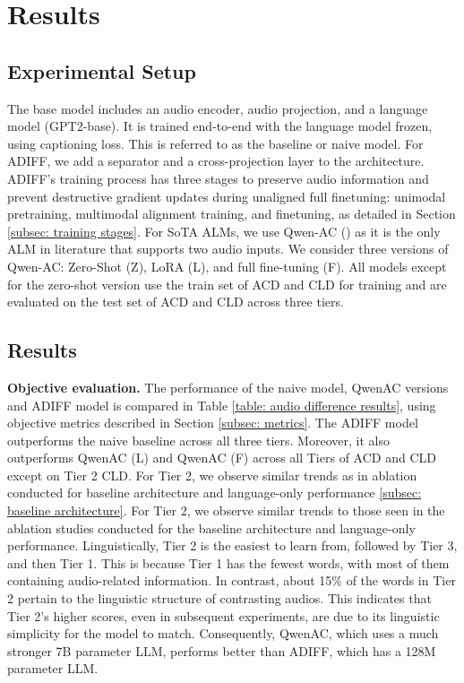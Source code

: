 \vspace{-0.1in}
\section{Results} \label{sec:results}

\vspace{-0.1in}
\subsection{Experimental Setup} 
\vspace{-0.1in}
The base model includes an audio encoder, audio projection, and a language model (GPT2-base). It is trained end-to-end with the language model frozen, using captioning loss. This is referred to as the baseline or naive model. For ADIFF, we add a separator and a cross-projection layer to the architecture. ADIFF’s training process has three stages to preserve audio information and prevent destructive gradient updates during unaligned full finetuning: unimodal pretraining, multimodal alignment training, and finetuning, as detailed in Section \ref{subsec: training stages}. For SoTA ALMs, we use Qwen-AC (\cite{qwenaudio}) as it is the only ALM in literature that supports two audio inputs. We consider three versions of Qwen-AC: Zero-Shot (Z), LoRA (L), and full fine-tuning (F). All models except for the zero-shot version use the train set of ACD and CLD for training and are evaluated on the test set of ACD and CLD across three tiers.

\subsection{Results} 
\vspace{-0.1in}
\textbf{Objective evaluation.} The performance of the naive model, QwenAC versions and ADIFF model is compared in Table \ref{table: audio difference results}, using objective metrics described in Section \ref{subsec: metrics}. The ADIFF model outperforms the naive baseline across all three tiers. Moreover, it also outperforms QwenAC (L) and QwenAC (F) across all Tiers of ACD and CLD except on Tier 2 CLD. For Tier 2, we observe similar trends as in ablation conducted for baseline architecture and language-only performance \ref{subsec: baseline architecture}. For Tier 2, we observe similar trends to those seen in the ablation studies conducted for the baseline architecture and language-only performance. Linguistically, Tier 2 is the easiest to learn from, followed by Tier 3, and then Tier 1. This is because Tier 1 has the fewest words, with most of them containing audio-related information. In contrast, about 15\% of the words in Tier 2 pertain to the linguistic structure of contrasting audios. This indicates that Tier 2's higher scores, even in subsequent experiments, are due to its linguistic simplicity for the model to match. Consequently, QwenAC, which uses a much stronger 7B parameter LLM, performs better than ADIFF, which has a 128M parameter LLM.

